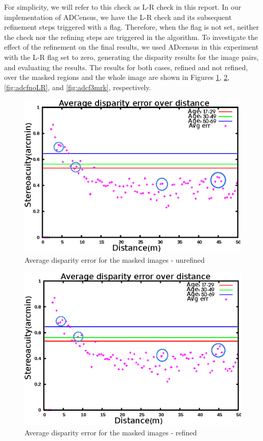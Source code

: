 For simplicity, we will refer
to this check as L-R check in this report.
In our implementation of ADCensus, we have the L-R check and its subsequent refinement steps triggered with a flag.
Therefore, when the flag is not set, neither the check nor the refining steps are triggered in the algorithm.
To investigate the effect of the refinement on the final results, we used 
ADcensus in this experiment with the L-R flag set to zero, generating the disparity results for the image pairs, and evaluating the results.
The results for both cases, refined and not refined, over the masked regions and the whole image are shown in Figures \ref{fig:adcmnoLR}, \ref{fig:adcm3mrk}, 
\ref{fig:adcfnoLR}, and \ref{fig:adcf3mrk}, respectively.

\begin{figure}[H]
\centering
\includegraphics[scale=0.95]{adcenmsk3NoLRmrk}
\caption{Average disparity error for the masked images - unrefined}
\label{fig:adcmnoLR}
\end{figure} 

\begin{figure}[H]
\centering
\includegraphics[scale=0.95]{adcenmsk3mrk}
\caption{Average disparity error for the masked images - refined}
\label{fig:adcm3mrk}
\end{figure} 

